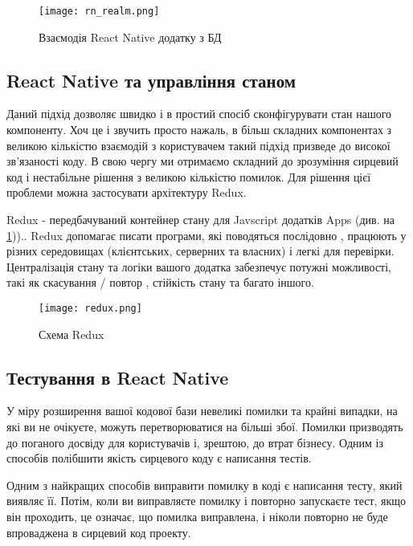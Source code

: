 \begin{figure}
    \begin{center}
        \texttt{[image: rn\_realm.png]}
    \end{center}
    \caption{Взаємодія React Native додатку з БД}
    \label{fig:rn_realm}
\end{figure}

\subsection{React Native та управління станом}
\label{subsec:rn_state_management}

Даний підхід дозволяє швидко і в простий спосіб сконфігурувати стан нашого компоненту.
Хоч це і звучить просто нажаль, в більш складних компонентах з великою кількістю взаємодій з користувачем такий підхід призведе до високої зв'язаності коду.
В свою чергу ми отримаємо складний до зрозуміння сирцевий код і нестабільне рішення з великою кількістю помилок.
Для рішення цієї проблеми можна застосувати архітектуру Redux.

Redux - передбачуваний контейнер стану для Javscript додатків Apps (див. на \ref{fig:rn_realm}))..
Redux допомагає писати програми, які поводяться послідовно , працюють у різних середовищах (клієнтських, серверних та власних) і легкі для перевірки. \cite{redux_home_page}
Централізація стану та логіки вашого додатка забезпечує потужні можливості, такі як скасування / повтор , стійкість стану та багато іншого. \cite{redux_home_page}

\begin{center}
    \begin{figure}
        \texttt{[image: redux.png]}
        \caption{Схема Redux}
        \label{fig:rn_redux}
    \end{figure}
\end{center}

\subsection{Тестування в React Native}
\label{subsec:rn_testing}
У міру розширення вашої кодової бази невеликі помилки та крайні випадки, на які ви не очікуєте, можуть перетворюватися на більші збої.
Помилки призводять до поганого досвіду для користувачів і, зрештою, до втрат бізнесу.
Одним із способів полібшити якість сирцевого коду є написання тестів.

Одним з найкращих способів виправити помилку в коді є написання тесту, який виявляє її.
Потім, коли ви виправляєте помилку і повторно запускаєте тест, якщо він проходить, це означає, що помилка виправлена, і ніколи повторно не буде впроваджена в сирцевий код проекту.

